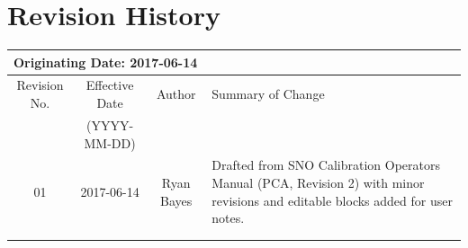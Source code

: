 \documentclass[11pt]{article}
\begin{document}
\section{Revision History}
\begin{tabular}{|c|c|c|p{6cm}|}
\hline\hline
\multicolumn{4}{|l|}{Originating Date: 2017-06-14}\\
\hline
Revision No. & Effective Date & Author & Summary of Change \\
& (YYYY-MM-DD) & & \\
\hline
01 & 2017-06-14 & Ryan Bayes & Drafted from SNO Calibration Operators Manual (PCA, Revision 2) with minor revisions and editable blocks added for user notes.\\
\hline
& & & \\
\hline
& & & \\
\hline \hline

\end{tabular}
\end{document}
